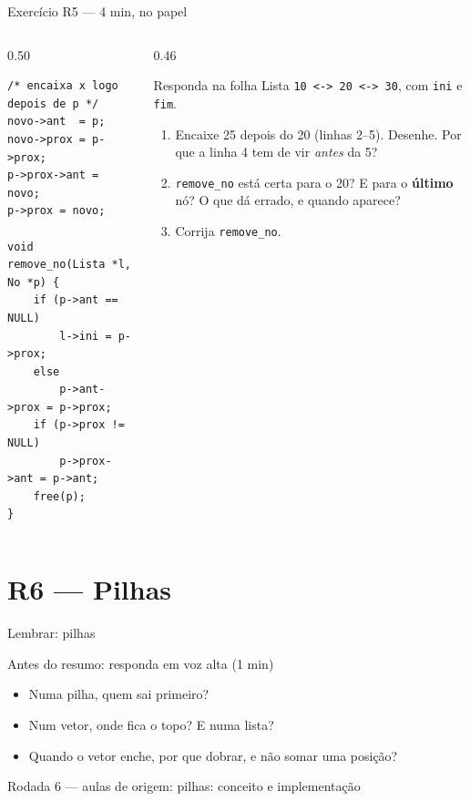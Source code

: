 \documentclass[aspectratio=169]{beamer}
\newcommand{\rodada}[4]{%
  \begin{frame}{Lembrar: #2}
    \begin{block}{Antes do resumo: responda em voz alta (1 min)}
      #4
    \end{block}
    \vfill
    {\small\textcolor{UFSGray}{Rodada #1 --- aulas de origem:} #3}
  \end{frame}}
\begin{document}
\begin{frame}[fragile]{Exercício R5 --- 4 min, no papel}
  \begin{columns}[T]
    \begin{column}{0.50\textwidth}
\begin{lstlisting}[style=numC]
/* encaixa x logo depois de p */
novo->ant  = p;
novo->prox = p->prox;
p->prox->ant = novo;
p->prox = novo;

void remove_no(Lista *l, No *p) {
    if (p->ant == NULL)
        l->ini = p->prox;
    else
        p->ant->prox = p->prox;
    if (p->prox != NULL)
        p->prox->ant = p->ant;
    free(p);
}
\end{lstlisting}
    \end{column}
    \begin{column}{0.46\textwidth}
      \begin{block}{Responda na folha}
        \small Lista \texttt{10 <-> 20 <-> 30}, com \texttt{ini} e
        \texttt{fim}.
        \begin{enumerate}
          \item[(a)] Encaixe 25 depois do 20 (linhas 2--5). Desenhe. Por que a
            linha 4 tem de vir \emph{antes} da 5?
          \item[(b)] \texttt{remove\_no} está certa para o 20? E para o
            \textbf{último} nó? O que dá errado, e quando aparece?
          \item[(c)] Corrija \texttt{remove\_no}.
        \end{enumerate}
      \end{block}
    \end{column}
  \end{columns}
\end{frame}

\section{R6 --- Pilhas}

\rodada{6}{pilhas}{pilhas: conceito e implementação}{
  \begin{itemize}
    \item Numa pilha, quem sai primeiro?
    \item Num vetor, onde fica o topo? E numa lista?
    \item Quando o vetor enche, por que dobrar, e não somar uma posição?
  \end{itemize}}
\end{document}
